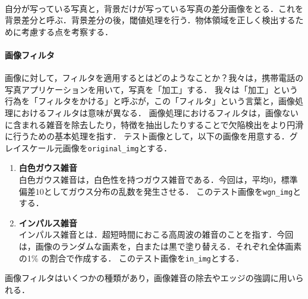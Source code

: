 \paragraph{\kadaiaf}自分が写っている写真と，背景だけが写っている写真の差分画像をとる．これを背景差分と呼ぶ．背景差分の後，閾値処理を行う．物体領域を正しく検出するために考慮する点を考察する．
\paragraph{画像フィルタ} 画像に対して，フィルタを適用するとはどのようなことか？我々は，携帯電話の写真アプリケーションを用いて，写真を「加工」する．
我々は「加工」という行為を「フィルタをかける」と呼ぶが，この「フィルタ」という言葉と，画像処理におけるフィルタは意味が異なる．
画像処理におけるフィルタは，画像ないに含まれる雑音を除去したり，特徴を抽出したりすることで欠陥検出をより円滑に行うための基本処理を指す\cite{画像フィルタ}．
\newcommand{\originimg}{\texttt{original\_img}}
\newcommand{\wgnimg}{\texttt{wgn\_img}}
\newcommand{\inimg}{\texttt{in\_img}}
テスト画像として，以下の画像を用意する．グレイスケール元画像を\originimg とする．
\begin{enumerate}
    \item \textbf{白色ガウス雑音}\\
          白色ガウス雑音は，白色性を持つガウス雑音である．今回は，平均\(0\)，標準偏差\(10\)としてガウス分布の乱数を発生させる．
          このテスト画像を\wgnimg とする．
    \item \textbf{インパルス雑音}\\
          インパルス雑音とは．超短時間におこる高周波の雑音のことを指す．今回は，画像のランダムな画素を，白または黒で塗り替える．それぞれ全体画素の1\(\%\) の割合で作成する．
          このテスト画像を\inimg とする．
\end{enumerate}
画像フィルタはいくつかの種類があり，画像雑音の除去やエッジの強調に用いられる．
